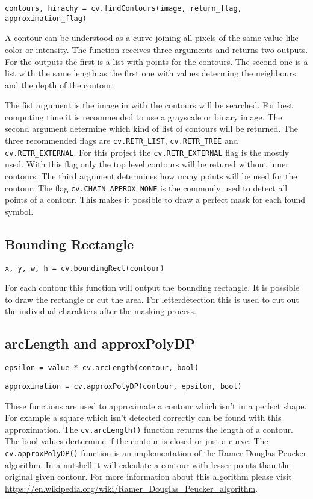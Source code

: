 \texttt{contours, hirachy = cv.findContours(image, return\_flag, approximation\_flag)}

A contour can be understood as a curve joining all pixels of the same value like color or intensity.
The function receives three arguments and returns two outputs.
For the outputs the first is a list with points for the contours.
The second one is a list with the same length as the first one with values determing the neighbours and the depth of the contour.

The fist argument is the image in with the contours will be searched.
For best computing time it is recommended to use a grayscale or binary image.
The second argument determine which kind of list of contours will be returned.
The three recommended flags are \texttt{cv.RETR\_LIST}, \texttt{cv.RETR\_TREE} and \texttt{cv.RETR\_EXTERNAL}.
For this project the \texttt{cv.RETR\_EXTERNAL} flag is the mostly used.
With this flag only the top level contours will be retured without inner contours.
The third argument determines how many points will be used for the contour.
The flag \texttt{cv.CHAIN\_APPROX\_NONE} is the commonly used to detect all points of a contour.
This makes it possible to draw a perfect mask for each found symbol.

\subsection{Bounding Rectangle}

\texttt{x, y, w, h = cv.boundingRect(contour)}

For each contour this function will output the bounding rectangle.
It is possible to draw the rectangle or cut the area.
For letterdetection this is used to cut out the individual charakters after the masking process.

\subsection{arcLength and approxPolyDP}

\texttt{epsilon = value * cv.arcLength(contour, bool)}

\texttt{approximation = cv.approxPolyDP(contour, epsilon, bool)}

These functions are used to approximate a contour which isn't in a perfect shape.
For example a square which isn't detected correctly can be found with this approximation.
The \texttt{cv.arcLength()} function returns the length of a contour.
The bool values dertermine if the contour is closed or just a curve.
The \texttt{cv.approxPolyDP()} function is an implementation of the Ramer-Douglas-Peucker algorithm.
In a nutshell it will calculate a contour with lesser points than the original given contour.
For more information about this algorithm please visit \url{https://en.wikipedia.org/wiki/Ramer\_Douglas\_Peucker\_algorithm}.


